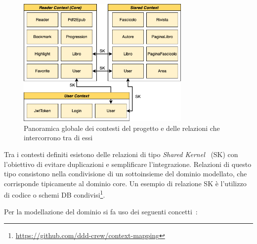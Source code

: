 \begin{figure}[H]
    \centering
    \includegraphics[width=0.75\textwidth]{img/ddd-context-map.png}
    \caption{Panoramica globale dei contesti del progetto e delle relazioni che intercorrono tra di essi}
    \label{context-map-png}
\end{figure}

Tra i contesti definiti esistono delle relazioni di tipo \textit{Shared Kernel}~\cite{evans_domain-driven_2004} (SK) con l'obiettivo di evitare duplicazioni e semplificare l'integrazione. Relazioni di questo tipo consistono nella condivisione di un sottoinsieme del dominio modellato, che corrisponde tipicamente al dominio core. Un esempio di relazione SK è l'utilizzo di codice o schemi DB condivisi\footnote{\href{https://github.com/ddd-crew/context-mapping}{https://github.com/ddd-crew/context-mapping}}. 

Per la modellazione del dominio si fa uso dei seguenti concetti~\cite{evans_domain-driven_2004}:

